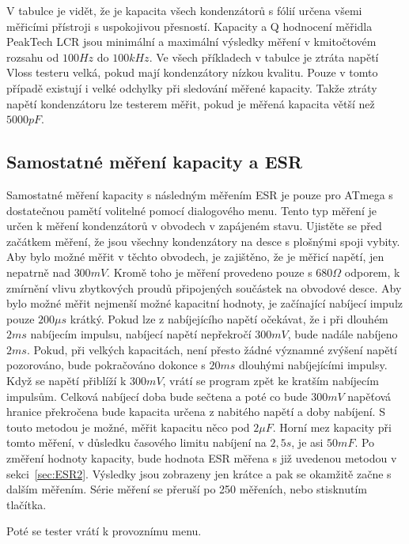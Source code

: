 V tabulce je vidět, že je kapacita všech kondenzátorů s fólií určena všemi měřicími přístroji s uspokojivou přesností.
Kapacity a Q hodnocení měřidla PeakTech LCR jsou minimální a maximální výsledky měření v kmitočtovém
rozsahu od \(100Hz\) do \(100kHz\).
Ve všech příkladech v tabulce je ztráta napětí Vloss testeru velká, pokud mají kondenzátory nízkou kvalitu.
Pouze v tomto případě existují i velké odchylky při sledování měřené kapacity.
Takže ztráty napětí kondenzátoru lze testerem měřit, pokud je měřená kapacita větší než \(5000pF\).

\subsection{Samostatné měření kapacity a ESR}
Samostatné měření kapacity s následným měřením ESR je pouze pro ATmega s dostatečnou pamětí
volitelné pomocí dialogového menu. Tento typ měření je určen k měření kondenzátorů v obvodech v zapájeném stavu.
Ujistěte se před začátkem měření, že jsou všechny kondenzátory na desce s plošnými spoji vybity. 
Aby bylo možné měřit v těchto obvodech, je zajištěno, že je měřicí napětí, jen nepatrně nad \(300mV\).
Kromě toho je měření provedeno pouze s \(680\Omega\) odporem, k zmírnění vlivu zbytkových proudů připojených součástek na obvodové desce.
Aby bylo možné měřit nejmenší možné kapacitní hodnoty, je začínající nabíjecí
impulz pouze \(200\mu s\) krátký. Pokud lze z nabíjejícího napětí očekávat,
že i při dlouhém \(2ms\) nabíjecím impulsu, nabíjecí napětí nepřekročí \(300mV\),
bude nadále nabíjeno \(2ms\).
Pokud, při velkých kapacitách, není přesto žádné významné zvýšení napětí pozorováno,
bude pokračováno dokonce s \(20ms\) dlouhými nabíjejícími impulsy.
Když se  napětí přiblíží k \(300mV\), vrátí se program zpět ke kratším nabíjecím impulsům.
Celková nabíjecí doba bude sečtena a poté co bude \(300mV\) napěťová hranice překročena
bude kapacita určena z nabitého napětí a doby nabíjení.
S touto metodou je možné, měřit kapacitu něco pod \(2\mu F\). Horní mez kapacity při tomto měření,
v důsledku časového limitu nabíjení na \(2,5s\), je asi \(50mF\).
Po změření hodnoty kapacity, bude hodnota ESR měřena s již uvedenou metodou v sekci~\ref{sec:ESR2}.
Výsledky jsou zobrazeny jen krátce a pak se okamžitě začne s dalším měřením.
Série měření se přeruší po 250 měřeních, nebo stisknutím tlačítka.

Poté se tester vrátí k provoznímu menu.

